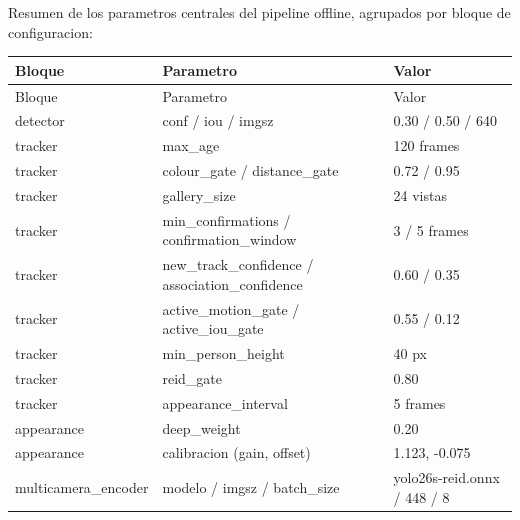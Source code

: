\documentclass[12pt,letterpaper]{article}
\begin{document}
Resumen de los parametros centrales del pipeline offline, agrupados por bloque de configuracion:


\begingroup\small\setlength{\tabcolsep}{4pt}\renewcommand{\arraystretch}{1.2}

\begin{longtable}{P{0.28\textwidth}P{0.22\textwidth}P{0.42\textwidth}}
\toprule

Bloque & Parametro & Valor \\

\midrule
\endfirsthead
\toprule
Bloque & Parametro & Valor \\
\midrule
\endhead

detector & conf / iou / imgsz & 0.30 / 0.50 / 640 \\

tracker & max\_\allowbreak age & 120 frames \\

tracker & colour\_\allowbreak gate / distance\_\allowbreak gate & 0.72 / 0.95 \\

tracker & gallery\_\allowbreak size & 24 vistas \\

tracker & min\_\allowbreak confirmations / confirmation\_\allowbreak window & 3 / 5 frames \\

tracker & new\_\allowbreak track\_\allowbreak confidence / association\_\allowbreak confidence & 0.60 / 0.35 \\

tracker & active\_\allowbreak motion\_\allowbreak gate / active\_\allowbreak iou\_\allowbreak gate & 0.55 / 0.12 \\

tracker & min\_\allowbreak person\_\allowbreak height & 40 px \\

tracker & reid\_\allowbreak gate & 0.80 \\

tracker & appearance\_\allowbreak interval & 5 frames \\

appearance & deep\_\allowbreak weight & 0.20 \\

appearance & calibracion (gain, offset) & 1.123, -0.075 \\

multicamera\_\allowbreak encoder & modelo / imgsz / batch\_\allowbreak size & yolo26s-reid.onnx / 448 / 8 \\


\end{longtable}
\end{document}
